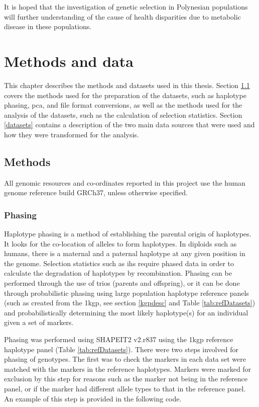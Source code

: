 \documentclass[]{report}
\begin{document}
It is hoped that the investigation of genetic selection in Polynesian
populations will further understanding of the cause of health
disparities due to metabolic disease in these populations.

\chapter{Methods and data}\label{methods-and-data}

This chapter describes the methods and datasets used in this thesis.
Section \ref{methods} covers the methods used for the preparation of the
datasets, such as haplotype phasing, \gls{pca}, and file format
conversions, as well as the methods used for the analysis of the
datasets, such as the calculation of selection statistics. Section
\ref{datasets} contains a description of the two main data sources that
were used and how they were transformed for the analysis.

\section{Methods}\label{methods}

All genomic resources and co-ordinates reported in this project use the
human genome reference build GRCh37, unless otherwise specified.

\subsection{Phasing}\label{phase}

Haplotype phasing is a method of establishing the parental origin of
haplotypes. It looks for the co-location of alleles to form haplotypes.
In diploids such as humans, there is a maternal and a paternal haplotype
at any given position in the genome. Selection statistics such as
\gls{ihs} require phased data in order to calculate the degradation of
haplotypes by recombination. Phasing can be performed through the use of
trios (parents and offspring), or it can be done through probabilistic
phasing using large population haplotype reference panels (such as
created from the \gls{1kgp}, see section \ref{kgpdesc} and Table
\ref{tab:refDatasets}) and probabilistically determining the most likely
haplotype(s) for an individual given a set of markers.

Phasing was performed using SHAPEIT2 v2.r837 \citep{Delaneau2013} using
the \gls{1kgp} reference haplotype panel (Table \ref{tab:refDatasets}).
There were two steps involved for phasing of genotypes. The first was to
check the markers in each data set were matched with the markers in the
reference haplotypes. Markers were marked for exclusion by this step for
reasons such as the marker not being in the reference panel, or if the
marker had different allele types to that in the reference panel. An
example of this step is provided in the following code.
\end{document}
